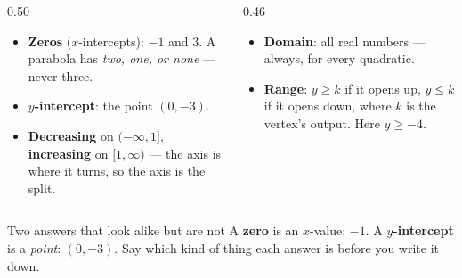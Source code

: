 \documentclass[aspectratio=169, 11pt]{beamer}
\begin{document}
\begin{frame}[t, plain]
  \begin{columns}[T]
    \begin{column}{0.50\textwidth}
      \begin{itemize}\setlength{\itemsep}{4pt}
        \item \textbf{Zeros} ($x$-intercepts): $-1$ and $3$. A parabola has \emph{two, one, or
              none} --- never three.
        \item \textbf{$y$-intercept}: the point $(0,-3)$.
        \item \textbf{Decreasing} on $(-\infty,1]$, \textbf{increasing} on $[1,\infty)$ --- the
              axis is where it turns, so the axis is the split.
      \end{itemize}
    \end{column}
    \begin{column}{0.46\textwidth}
      \begin{itemize}\setlength{\itemsep}{4pt}
        \item \textbf{Domain}: all real numbers --- always, for every quadratic.
        \item \textbf{Range}: $y\ge k$ if it opens up, $y\le k$ if it opens down, where $k$ is the
              vertex's output. Here $y\ge-4$.
      \end{itemize}
    \end{column}
  \end{columns}
  \vspace{3pt}
  \begin{block}{Two answers that look alike but are not}
    A \textbf{zero} is an $x$-value: $-1$. A \textbf{$y$-intercept} is a \emph{point}: $(0,-3)$.
    Say which kind of thing each answer is before you write it down.
  \end{block}
\end{frame}
\end{document}
